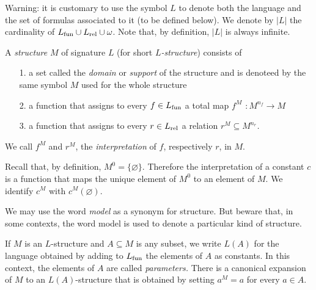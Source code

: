 Warning: it is customary to use the symbol \emph{$L$} to denote both the language and the set of formulas associated to it (to be defined below).
We denote by \emph{$|L|$} the cardinality of $L_{\rm fun}\cup L_{\rm rel}\cup\omega$.
Note that, by definition, $|L|$ is always infinite.

\begin{definition}
A \emph{structure\/} $M$ of signature $L$ (for short \emph{$L$-structure}) consists of

\begin{itemize}
\item[1.] a set called the \emph{domain\/} or \emph{support} of the structure and is denoteed by the same symbol $M$ used for the whole structure
\item[2.] a function that assigns to every $f\in L_{\rm fun}$ a total map \emph{$f^M$ $: M^{n_f}\to M$}
\item[3.] a function that assigns to every  $r\in L_{\rm rel}$ a relation \emph{$r^M\subseteq M^{n_r}$.}
\end{itemize}
We call $f^M$ and $r^M$, the \emph{interpretation\/} of $f$, respectively $r$, in $M$.
\end{definition}

Recall that, by definition, $M^0=\{\varnothing\}$.
Therefore the interpretation of a constant $c$ is a function that maps the unique element of $M^0$ to an element of $M$.
We identify \emph{$c^M$\/} with $c^M(\varnothing)$.

We may use the word \emph{model\/} as a synonym for structure.
But beware that, in some contexts, the word model is used to denote a particular kind of structure.

If $M$ is an $L$-structure and $A\subseteq M$ is any subset, we write \emph{$L(A)$\/} for the language obtained by  adding to $L_{\rm fun}$ the elements of $A$ as constants.
In this context, the elements of $A$ are called \emph{parameters.} 
There is a canonical expansion of $M$ to an $L(A)$-structure that is obtained by setting $a^M=a$ for every $a\in A$.

